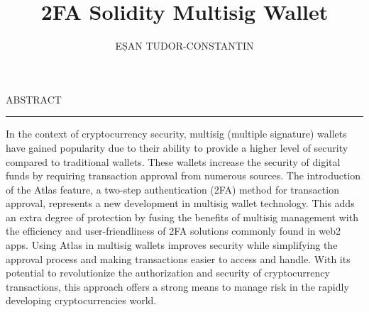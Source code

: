 \documentclass[12pt]{report}
\begin{document}
\title{2FA Solidity Multisig Wallet}					   
\author{EȘAN TUDOR-CONSTANTIN}											
				
\maketitle

\newpage
\thispagestyle{empty}
\mbox{}
\newpage
{} 

\cleardoublepage
ABSTRACT
\vspace{0.5cm}	
\hrule
\vspace{0.5cm}	

In the context of cryptocurrency security, multisig (multiple signature) wallets have gained popularity due to their ability to provide a higher level of security compared to traditional wallets. These wallets increase the security of digital funds by requiring transaction approval from numerous sources. The introduction of the Atlas feature, a two-step authentication (2FA) method for transaction approval, represents a new development in multisig wallet technology. This adds an extra degree of protection by fusing the benefits of multisig management with the efficiency and user-friendliness of 2FA solutions commonly found in web2 apps. Using Atlas in multisig wallets improves security while simplifying the approval process and making transactions easier to access and handle. With its potential to revolutionize the authorization and security of cryptocurrency transactions, this approach offers a strong means to manage risk in the rapidly developing cryptocurrencies world.














\tableofcontents


\newpage
{}










\end{document}
